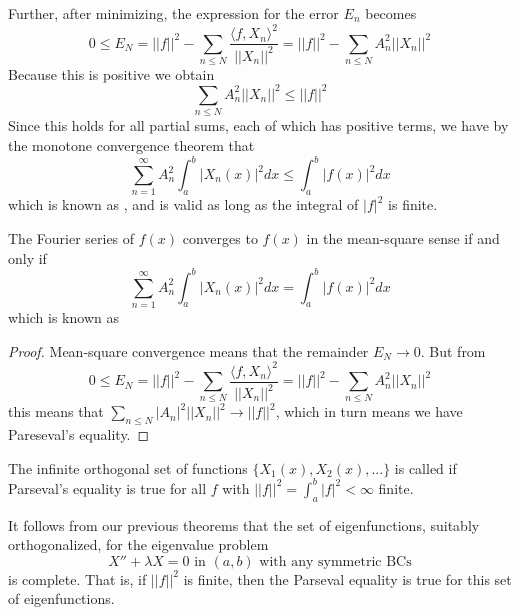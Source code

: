 Further, after minimizing, the expression for the error $E_n$ becomes \begin{equation*}
    0\leq E_N = ||f||^2 - \sum_{n\leq N}\frac{\langle f,X_n\rangle^2}{||X_n||^2} = ||f||^2 - \sum_{n\leq N}A_n^2||X_n||^2
\end{equation*}
Because this is positive we obtain \begin{equation*}
    \sum_{n\leq N}A_n^2||X_n||^2 \leq ||f||^2
\end{equation*}
Since this holds for all partial sums, each of which has positive terms, we have by the monotone convergence theorem that \begin{equation}
    \boxed{\sum_{n=1}^{\infty}A_n^2\int_a^b|X_n(x)|^2dx \leq \int_a^b|f(x)|^2dx}
\end{equation}
which is known as , and is valid as long as the integral of $|f|^2$ is finite.

\begin{theorem}
    The Fourier series of $f(x)$ converges to $f(x)$ in the mean-square sense if and only if \begin{equation}
        \boxed{\sum_{n=1}^{\infty}A_n^2\int_a^b|X_n(x)|^2dx = \int_a^b|f(x)|^2dx}
    \end{equation}
    which is known as 
\end{theorem}
\begin{proof}
    Mean-square convergence means that the remainder $E_N\rightarrow 0$. But from \begin{equation*}
        0\leq E_N = ||f||^2 - \sum_{n\leq N}\frac{\langle f,X_n\rangle^2}{||X_n||^2} = ||f||^2 - \sum_{n\leq N}A_n^2||X_n||^2
    \end{equation*}
    this means that $\sum_{n\leq N}|A_n|^2||X_n||^2\rightarrow ||f||^2$, which in turn means we have Pareseval's equality.
\end{proof}

\begin{definition}
    The infinite orthogonal set of functions $\{X_1(x),X_2(x),...\}$ is called  if Parseval's equality is true for all $f$ with $||f||^2 = \int_a^b|f|^2 < \infty$ finite.
\end{definition}
It follows from our previous theorems that the set of eigenfunctions, suitably orthogonalized, for the eigenvalue problem \begin{equation*}
    X'' + \lambda X=0\text{ in } (a,b)\text{ with any symmetric BCs}
\end{equation*}
is complete. That is, if $||f||^2$ is finite, then the Parseval equality is true for this set of eigenfunctions.



